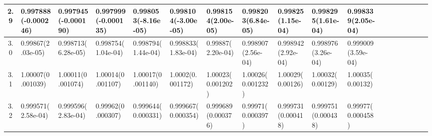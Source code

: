 \documentclass[
	article,			%
	12pt,				%
	twoside,			%
	a4paper,			%
	english,			%
	brazil,				%
	]{abntex2}
\begin{document}
\begin{landscape}
\begin{table}
\begin{tabular}{c||p{18mm}|p{18mm}|p{18mm}|p{18mm}|p{18mm}|p{18mm}|p{18mm}|p{18mm}|p{18mm}|p{18mm}|p{18mm}|p{18mm}|p{18mm}|p{18mm}|p{18mm}|p{18mm}|p{18mm}}
    			2.9 &0.997888\newline(-0.000246)&0.997945\newline(-0.000190)&0.997999\newline(-0.000135)&0.998053\newline(-8.16e-05)&0.998104\newline(-3.00e-05)&0.998154\newline(2.00e-05)&0.998203\newline(6.84e-05)&0.99825\newline(1.15e-04)&0.998295\newline(1.61e-04)&0.998339\newline(2.05e-04)\\\hline
    			3.0 &0.99867\newline(2.03e-05)&0.998713\newline(6.28e-05)&0.998754\newline(1.04e-04)&0.998794\newline(1.44e-04)&0.998833\newline(1.83e-04)&0.99887\newline(2.20e-04)&0.998907\newline(2.56e-04)&0.998942\newline(2.92e-04)&0.998976\newline(3.26e-04)&0.999009\newline(3.59e-04)\\\hline
    			3.1 &1.00007\newline(0.001039)&1.00011\newline(0.001074)&1.00014\newline(0.001107)&1.00017\newline(0.001140)&1.0002\newline(0.001172)&1.00023\newline(0.001202)&1.00026\newline(0.001232)&1.00029\newline(0.00126)&1.00032\newline(0.00129)&1.00035\newline(0.00132)\\\hline
    			3.2 &0.999571\newline(2.58e-04)&0.999596\newline(2.83e-04)&0.99962\newline(0.000307)&0.999644\newline(0.000331)&0.999667\newline(0.000354)&0.999689\newline(0.000376)&0.99971\newline(0.000397)&0.999731\newline(0.000418)&0.999751\newline(0.000438)&0.99977\newline(0.000458)\\\hline
    			


\end{tabular}
\end{table}
\end{landscape}
\end{document}
